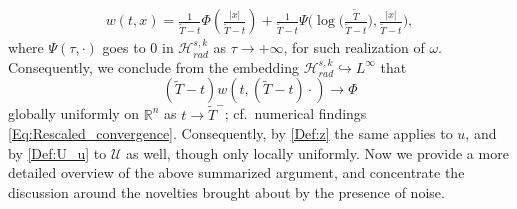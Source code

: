 \documentclass[12pt,reqno]{amsart}
\theoremstyle{plain}
\theoremstyle{remark}
\theoremstyle{plain}
\theoremstyle{definition}
\numberwithin{equation}{section}
\numberwithin{equation}{section}
\def\R{{\mathbb R}}
\newcommand{\HH}{\mathcal{H}}
\begin{document}
	\begin{align}\label{eq:ansatz_sol}
		w(t,x)=\frac{1}{\tilde{T}-t}\Phi\left(\frac{\lvert x\rvert}{\tilde{T}-t}\right)+\frac{1}{\tilde{T}-t}{\Psi}\bigg(\log\bigg(\frac{\tilde{T}}{\tilde{T}-t}\bigg),\frac{\lvert x\rvert}{\tilde{T}-t}\bigg),
	\end{align}
	where ${\Psi}(\tau,\cdot)$ goes to $0$ in $\HH_{rad}^{s,k}$ as $\tau\rightarrow +\infty$, for such realization of $\omega$. Consequently, we conclude from the embedding $\mathcal{H}^{s,k}_{rad} \hookrightarrow L^\infty$ that
	\begin{equation*}
		(\tilde{T}-t)w(t,(\tilde{T}-t)\cdot) \rightarrow \Phi
	\end{equation*}
	globally uniformly on $\R^n$ as $t \rightarrow \tilde{T}^-$; cf.~numerical findings \eqref{Eq:Rescaled_convergence}.
	Consequently, by \eqref{Def:z} the same applies to $u$, and by \eqref{Def:U_u} to $\mathcal{U}$ as well, though only locally uniformly.
		Now we provide a more detailed overview of the above summarized argument, and concentrate the discussion around the novelties brought about by the presence of noise.
\end{document}
